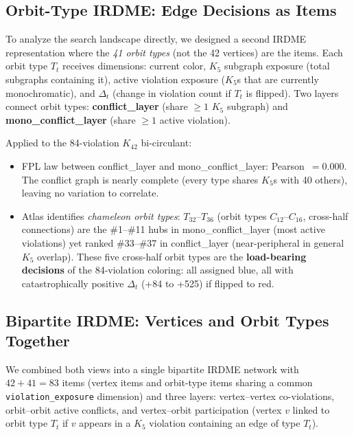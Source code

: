 \documentclass[11pt]{article}
\begin{document}
\subsection{Orbit-Type IRDME: Edge Decisions as Items}
\label{sec:irdme_orbits}

To analyze the search landscape directly, we designed a second IRDME representation
where the \emph{41 orbit types} (not the 42 vertices) are the items.
Each orbit type $T_t$ receives dimensions: current color, $K_5$ subgraph exposure
(total subgraphs containing it), active violation exposure ($K_5$s that are
currently monochromatic), and $\Delta_t$ (change in violation count if $T_t$ is flipped).
Two layers connect orbit types: \textbf{conflict\_layer} (share $\geq 1$ $K_5$ subgraph)
and \textbf{mono\_conflict\_layer} (share $\geq 1$ active violation).

Applied to the 84-violation $K_{42}$ bi-circulant:
\begin{itemize}
\item FPL law between conflict\_layer and mono\_conflict\_layer: Pearson~$= 0.000$.
      The conflict graph is nearly complete (every type shares $K_5$s with 40 others),
      leaving no variation to correlate.
\item Atlas identifies \emph{chameleon orbit types}: $T_{32}$--$T_{36}$ (orbit types
      $C_{12}$--$C_{16}$, cross-half connections) are the \#1--\#11 hubs in
      mono\_conflict\_layer (most active violations) yet ranked \#33--\#37 in
      conflict\_layer (near-peripheral in general $K_5$ overlap).
      These five cross-half orbit types are the \textbf{load-bearing decisions}
      of the 84-violation coloring: all assigned blue, all with catastrophically
      positive $\Delta_t$ (+84 to +525) if flipped to red.
\end{itemize}

\subsection{Bipartite IRDME: Vertices and Orbit Types Together}
\label{sec:irdme_bipartite}

We combined both views into a single bipartite IRDME network with
$42 + 41 = 83$ items (vertex items and orbit-type items sharing a common
\texttt{violation\_exposure} dimension) and three layers:
vertex--vertex co-violations, orbit--orbit active conflicts, and
vertex--orbit participation (vertex $v$ linked to orbit type $T_t$ if $v$
appears in a $K_5$ violation containing an edge of type $T_t$).
\end{document}
